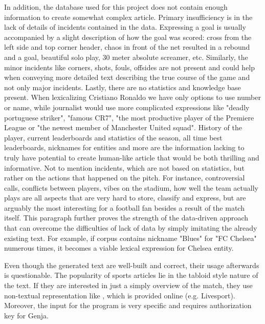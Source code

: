 In addition, the database used for this project does not contain enough information to create somewhat complex article. Primary insufficiency is in the lack of details of incidents contained in the data. Expressing a goal is usually accompanied by a slight description of how the goal was scored: cross from the left side and top corner header, chaos in front of the net resulted in a rebound and a goal, beautiful solo play, 30 meter absolute screamer, etc. Similarly, the minor incidents like corners, shots, fouls, offsides are not present and could help when conveying more detailed text describing the true course of the game and not only major incidents. Lastly, there are no statistics and knowledge base present. When lexicalizing Cristiano Ronaldo we have only options to use number or name, while journalist would use more complicated expressions like "deadly portuguese striker", "famous CR7", "the most productive player of the Premiere League or "the newest member of Manchester United squad". History of the player, current leaderboards and statistics of the season, all time best leaderboards, nicknames for entities and more are the information lacking to truly have potential to create human-like article that would be both thrilling and informative. Not to mention incidents, which are not based on statistics, but rather on the actions that happened on the pitch. For instance, controversial calls, conflicts between players, vibes on the stadium, how well the team actually plays are all aspects that are very hard to store, classify and express, but are arguably the most interesting for a football fan besides a result of the match itself. This paragraph further proves the strength of the data-driven approach that can overcome the difficulties of lack of data by simply imitating the already existing text. For example, if corpus contains nickname "Blues" for "FC Chelsea" numerous times, it becomes a viable lexical expression for Chelsea entity.

Even though the generated text are well-built and correct, their usage afterwards is questionable. The popularity of sports articles lie in the tabloid style nature of the text. If they are interested in just a simply overview of the match, they use non-textual representation like , which is provided online (e.g. Livesport). Moreover, the input for the program is very specific and requires authorization key for Genja.
































